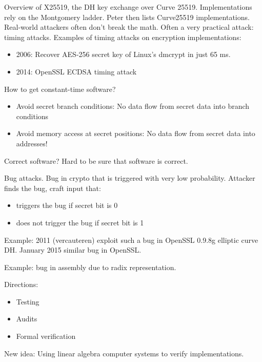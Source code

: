 \documentclass[11pt]{article}
\begin{document}
Overview of X25519, the DH key exchange over Curve 25519. Implementations rely on the Montgomery ladder. Peter then lists Curve25519 implementations. Real-world attackers often don’t break the math. Often a very practical attack: timing attacks. Examples of timing attacks on encryption implementations:
\begin{itemize}
\item 2006: Recover AES-256 secret key of Linux’s dmcrypt in just 65 ms.
\item 2014: OpenSSL ECDSA timing attack
\end{itemize}

How to get constant-time software?

\begin{itemize}
\item Avoid secret branch conditions: No data flow from secret data into branch conditions
\item Avoid memory access at secret positions: No data flow from secret data into addresses!
\end{itemize}

Correct software? Hard to be sure that software is correct.

Bug attacks. Bug in crypto that is triggered with very low probability. Attacker finds the bug, craft input that:
\begin{itemize}
\item triggers the bug if secret bit is 0
\item does not trigger the bug if secret bit is 1
\end{itemize}

Example: 2011 (vercauteren) exploit such a bug in OpenSSL 0.9.8g elliptic curve DH. January 2015 similar bug in OpenSSL.

Example: bug in assembly due to radix representation.

Directions:
\begin{itemize}
\item Testing
\item Audits
\item Formal verification
\end{itemize}

New idea: Using linear algebra computer systems to verify implementations.
\end{document}
